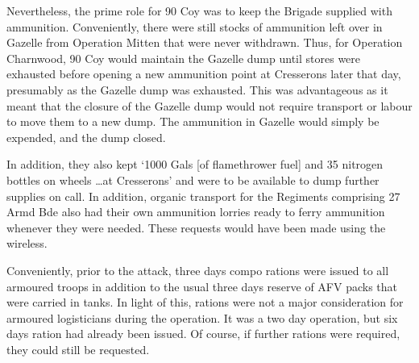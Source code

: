 \documentclass[noraggedright]{turabian-researchpaper}
\newcommand{\CharnAdm}{27 Armd Bde Adm Order No. 7, 7 July 1944}
\begin{document}
Nevertheless, the prime role for 90 Coy was to keep the Brigade supplied
with ammunition.  Conveniently, there were still stocks of ammunition left
over in Gazelle from Operation Mitten that were never withdrawn.  Thus, for
Operation Charnwood, 90 Coy would maintain the Gazelle dump until stores 
were exhausted before opening a new ammunition point at Cresserons later 
that day, presumably as the Gazelle dump was exhausted.\autocites[\CharnAdm]
{27wd}[8 July 1944]{90wd}
This was advantageous as it meant that the closure of the Gazelle dump would 
not require transport or labour to move them to a new dump.  The ammunition 
in Gazelle would simply be expended, and the dump closed.  

In addition, they also kept `1000 Gals [of flamethrower fuel]
and 35 nitrogen bottles on wheels \ldots at Cresserons' and were to be
available to dump further supplies on call.\autocite[\CharnAdm][Para 6]
{27wd} In addition, organic transport for the Regiments comprising 27 Armd
Bde also had their own ammunition lorries ready to ferry ammunition whenever
they were needed.  These requests would have been made using the 
wireless.\autocite[13th/18th Royal Hussars Operation Order No. 1, Operation
Charnwood (See July appendix)][Para 9b]{1318wd}

Conveniently, prior to the attack, three days compo rations were issued to
all armoured troops in addition to the usual three days reserve of AFV
packs that were carried in tanks.\autocite[\CharnAdm][Para 7]{27wd}  
In light of this, rations were not a 
major consideration for armoured logisticians during the operation.  It was
a two day operation, but six days ration had already been issued.  Of course,
if further rations were required, they could still be requested.
\end{document}
